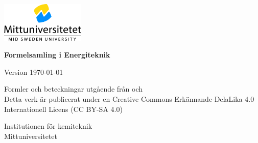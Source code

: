 \begin{titlepage}
    \begin{center}
        \includegraphics[width=0.3\textwidth, right]{MIUNLogo.jpg}
        \vspace*{4cm}
            
        \Huge
        \textbf{Formelsamling i Energiteknik} \par
            
        \Large
        \renewcommand{\dateseparator}{-}
        Version \today ~\currenttime
            
        \vspace{2,5cm}
            
            
        
        \vfill
            
		\normalsize
		Formler och beteckningar utgående från \cite{soleimani_mohseni_formelsamling_2018} och \cite{alvarez_energiteknik_2006} \\
		Detta verk är publicerat under en Creative Commons Erkännande-DelaLika 4.0 Internationell Licens (CC BY-SA 4.0)

            
        \Large
        Institutionen för kemiteknik\\
        Mittuniversitetet\\
            
    \end{center}
\end{titlepage}
